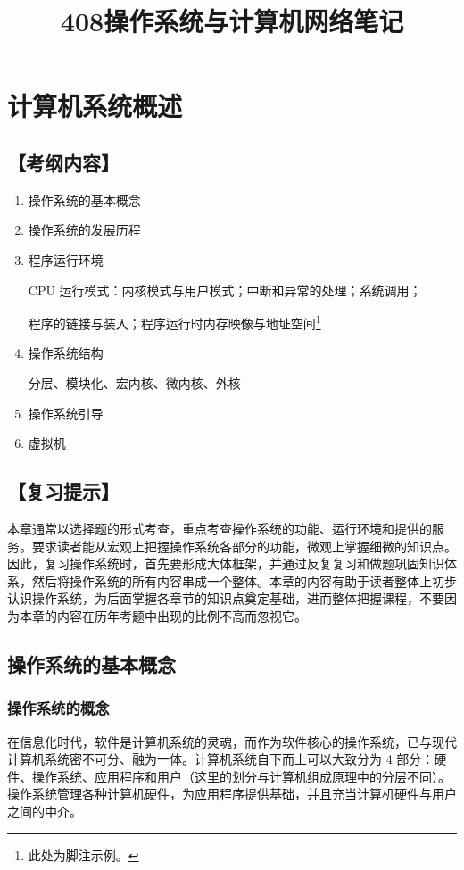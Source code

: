 \documentclass{ctexbook}
\title{408操作系统与计算机网络笔记}
\author{}
\date{}
\begin{document}
	\maketitle
	\tableofcontents
	\newpage
	
	\chapter{计算机系统概述}
	
	\section*{【考纲内容】}
	
	\begin{enumerate}
		\item 操作系统的基本概念
		\item 操作系统的发展历程
		\item 程序运行环境
		
		
		CPU 运行模式：内核模式与用户模式；中断和异常的处理；系统调用；
		
		程序的链接与装入；程序运行时内存映像与地址空间\footnote{此处为脚注示例。}
		
		\item 操作系统结构
		
		
		分层、模块化、宏内核、微内核、外核
		
		\item 操作系统引导
		\item 虚拟机
	\end{enumerate}
	
	\section*{【复习提示】}
	
	本章通常以选择题的形式考查，重点考查操作系统的功能、运行环境和提供的服务。要求读者能从宏观上把握操作系统各部分的功能，微观上掌握细微的知识点。因此，复习操作系统时，首先要形成大体框架，并通过反复复习和做题巩固知识体系，然后将操作系统的所有内容串成一个整体。本章的内容有助于读者整体上初步认识操作系统，为后面掌握各章节的知识点奠定基础，进而整体把握课程，不要因为本章的内容在历年考题中出现的比例不高而忽视它。
	
	\section{操作系统的基本概念}
	\subsection{操作系统的概念}
	在信息化时代，软件是计算机系统的灵魂，而作为软件核心的操作系统，已与现代计算机系统密不可分、融为一体。计算机系统自下而上可以大致分为 4 部分：硬件、操作系统、应用程序和用户（这里的划分与计算机组成原理中的分层不同）。操作系统管理各种计算机硬件，为应用程序提供基础，并且充当计算机硬件与用户之间的中介。
	
\end{document}
